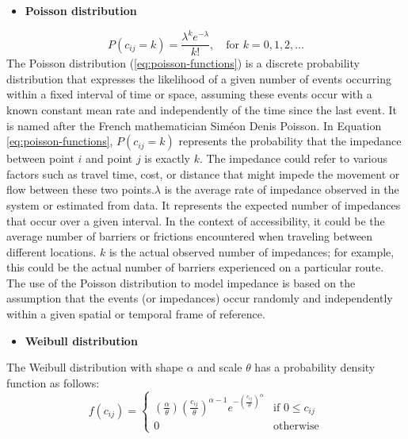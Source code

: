 \documentclass[12pt,twoside]{reedthesis}
\providecommand{\tightlist}{%
  \setlength{\itemsep}{0pt}\setlength{\parskip}{0pt}}
\begin{document}
\begin{itemize}
\tightlist
\item
  \textbf{Poisson distribution}
\end{itemize}
\begin{equation}
P(c_{ij} = k) = \frac{\lambda^k e^{-\lambda}}{k!}, \quad \text{for } k = 0, 1, 2, \ldots
\label{eq:poisson-functions}
\end{equation}
The Poisson distribution (\eqref{eq:poisson-functions}) is a discrete probability distribution that expresses the likelihood of a given number of events occurring within a fixed interval of time or space, assuming these events occur with a known constant mean rate and independently of the time since the last event. It is named after the French mathematician Siméon Denis Poisson. In Equation \eqref{eq:poisson-functions}, \(P(c_{ij} =k)\) represents the probability that the impedance between point \(i\) and point \(j\) is exactly \(k\). The impedance could refer to various factors such as travel time, cost, or distance that might impede the movement or flow between these two points.\(\lambda\) is the average rate of impedance observed in the system or estimated from data. It represents the expected number of impedances that occur over a given interval. In the context of accessibility, it could be the average number of barriers or frictions encountered when traveling between different locations. \(k\) is the actual observed number of impedances; for example, this could be the actual number of barriers experienced on a particular route. The use of the Poisson distribution to model impedance is based on the assumption that the events (or impedances) occur randomly and independently within a given spatial or temporal frame of reference.
\begin{itemize}
\tightlist
\item
  \textbf{Weibull distribution}
\end{itemize}
The Weibull distribution with shape \(\alpha\) and scale \(\theta\) has a probability density function as follows:
\begin{equation}
f(c_{ij}) =
\begin{cases}
\left( \frac{\alpha}{\theta}\right) \left( \frac{c_{ij}}{\theta}\right)^{\alpha - 1} e^{-\left(\frac{c_{ij}}{\theta}\right)^\alpha} & \text{if } 0 \leq c_{ij} \\
0 & \text{otherwise}
\end{cases}
\label{eq:weibull-functions}
\end{equation}
\end{document}
